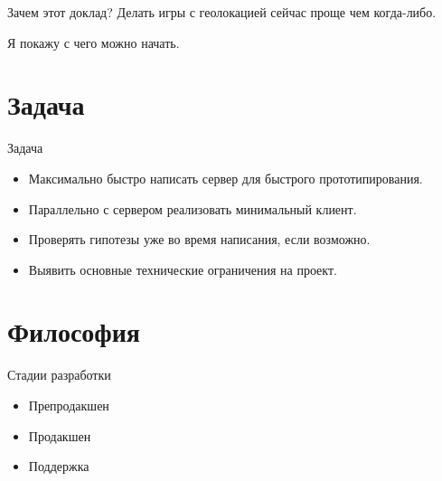 \documentclass[aspectratio=169,handout,bigger]{beamer}
\begin{document}

\begin{frame}{Зачем этот доклад?}
  Делать игры с геолокацией сейчас проще чем когда-либо.
  \vspace*{1em}\par
  Я покажу с чего можно начать.
\end{frame}


\section{Задача}


\begin{frame}{Задача}
  \begin{itemize}
    \item Максимально быстро написать сервер для быстрого прототипирования.
    \item Параллельно с сервером реализовать минимальный клиент.
    \item Проверять гипотезы уже во время написания, если возможно.
    \item Выявить основные технические ограничения на проект.
  \end{itemize}
\end{frame}


\section{Философия}


\begin{frame}{Стадии разработки}
  \begin{itemize}
    \item Препродакшен
    \item Продакшен
    \item Поддержка
  \end{itemize}
\end{frame}

\end{document}
